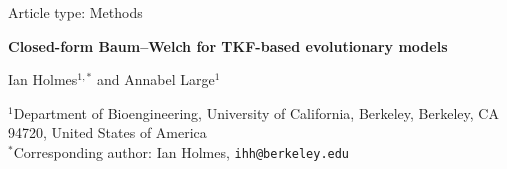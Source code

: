 \documentclass[11pt]{article}
\begin{document}
\doublespacing
\linenumbers

\begin{singlespace}
\thispagestyle{empty}
\begin{center}
{\normalsize Article type: Methods\par}
\vspace{1.5em}
{\Large\bfseries Closed-form Baum--Welch for TKF-based evolutionary models\par}
\vspace{1.5em}
{\large Ian Holmes$^{1,\ast}$ and Annabel Large$^{1}$\par}
\vspace{1.2em}
\begin{minipage}{0.85\textwidth}\centering
$^{1}$Department of Bioengineering, University of California, Berkeley,
Berkeley, CA 94720, United States of America\\[0.6em]
$^{\ast}$Corresponding author: Ian Holmes, \texttt{ihh@berkeley.edu}
\end{minipage}
\end{center}
\end{singlespace}

\vspace{2em}
\end{document}

